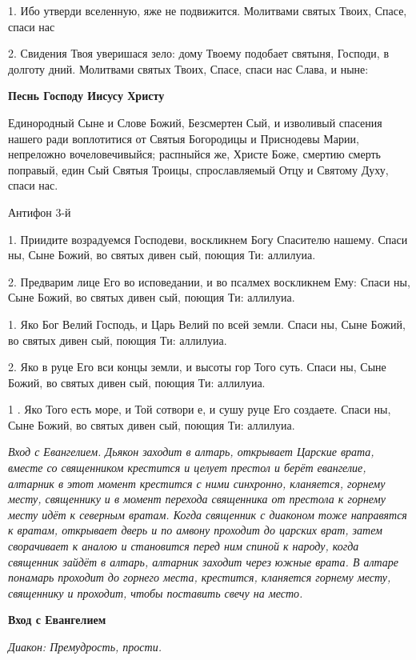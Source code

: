 1. Ибо утверди вселенную, яже не подвижится. Молитвами святых Твоих, Спасе, спаси нас 


2. Свидения Твоя уверишася зело: дому Твоему подобает святыня, Господи, в долготу дний. Молитвами святых Твоих, Спасе, спаси нас Слава, и ныне:


\medskip
\bfseries  Песнь Господу Иисусу Христу\normalfont{} 


Единородный Сыне и Слове Божий, Безсмертен Сый, и изволивый спасения нашего ради воплотитися от Святыя Богородицы и Приснодевы Марии, непреложно вочеловечивыйся; распныйся же, Христе Боже, смертию смерть поправый, един Сый Святыя Троицы, спрославляемый Отцу и Святому Духу, спаси нас. 

\medskip
Антифон 3-й 


1. Приидите возрадуемся Господеви, воскликнем Богу Спасителю нашему. Спаси ны, Сыне Божий, во святых дивен сый, поющия Ти: аллилуиа. 


2. Предварим лице Его во исповедании, и во псалмех воскликнем Ему: Спаси ны, Сыне Божий, во святых дивен сый, поющия Ти: аллилуиа. 


1. Яко Бог Велий Господь, и Царь Велий по всей земли. Спаси ны, Сыне Божий, во святых дивен сый, поющия Ти: аллилуиа. 


2. Яко в руце Его вси концы земли, и высоты гор Того суть. Спаси ны, Сыне Божий, во святых дивен сый, поющия Ти: аллилуиа. 


1 . Яко Того есть море, и Той сотвори е, и сушу руце Его создаете. Спаси ны, Сыне Божий, во святых дивен сый, поющия Ти: аллилуиа. 


\itshape Вход с Евангелием. Дьякон заходит в алтарь, открывает Царские врата, вместе со священником крестится и целует престол и берёт евангелие, алтарник в этот момент крестится с ними синхронно, кланяется, горнему месту, священнику и в момент перехода священника от престола к горнему месту идёт к северным вратам. Когда священник с диаконом тоже направятся к вратам, открывает дверь и по амвону проходит до царских врат, затем сворачивает к аналою и становится перед ним спиной к народу, когда священник зайдёт в алтарь, алтарник заходит через южные врата. В алтаре понамарь проходит до горнего места, крестится, кланяется горнему месту, священнику и проходит, чтобы поставить свечу на место.\normalfont{}


\medskip


\bfseries Вход с Евангелием \normalfont{}


\itshape Диакон:\normalfont{} Премудрость, прости.


